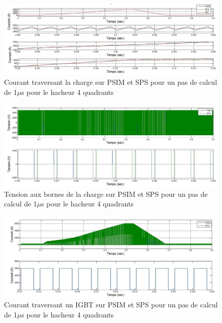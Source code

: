 \documentclass[11pt,letterpaper,final]{report}
\begin{document}
\begin{figure}[htb]
\centering
\includegraphics[scale=0.5]{Fig/Hacheur4Quadrants/HacheurCourantCharge1u.jpg}
\caption{Courant traversant la charge sur PSIM et SPS pour un pas de calcul de 1$\mu$s pour le hacheur 4 quadrants}
\label{hc_cou_ch_1}
\end{figure}


\begin{figure}[htb]
\centering
\includegraphics[scale=0.5]{Fig/Hacheur4Quadrants/HacheurTensionCharge1u.jpg}
\caption{Tension aux bornes de la charge sur PSIM et SPS pour un pas de calcul de 1$\mu$s pour le hacheur 4 quadrants}
\label{hc_ten_ch_1}
\end{figure}


\begin{figure}[htb]
\centering
\includegraphics[scale=0.5]{Fig/Hacheur4Quadrants/HacheurCourantIGBT1u.jpg}
\caption{Courant traversant un IGBT sur PSIM et SPS pour un pas de calcul de 1$\mu$s pour le hacheur 4 quadrants}
\label{hc_IG_cou_1}
\end{figure}
\end{document}

